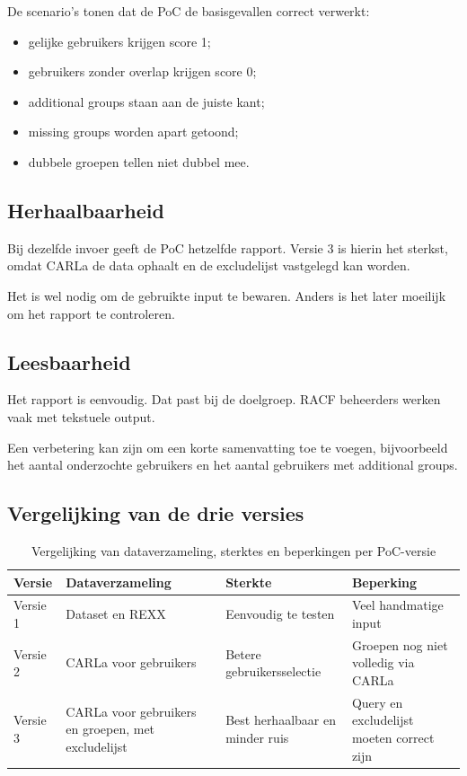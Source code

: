 De scenario's tonen dat de PoC de basisgevallen correct verwerkt:

\begin{itemize}
	\item gelijke gebruikers krijgen score 1;
	\item gebruikers zonder overlap krijgen score 0;
	\item additional groups staan aan de juiste kant;
	\item missing groups worden apart getoond;
	\item dubbele groepen tellen niet dubbel mee.
\end{itemize}

\subsection*{Herhaalbaarheid}

Bij dezelfde invoer geeft de PoC hetzelfde rapport. Versie 3 is hierin het sterkst, omdat CARLa de data ophaalt en de excludelijst vastgelegd kan worden.

Het is wel nodig om de gebruikte input te bewaren. Anders is het later moeilijk om het rapport te controleren.

\subsection*{Leesbaarheid}

Het rapport is eenvoudig. Dat past bij de doelgroep. RACF beheerders werken vaak met tekstuele output.

Een verbetering kan zijn om een korte samenvatting toe te voegen, bijvoorbeeld het aantal onderzochte gebruikers en het aantal gebruikers met additional groups.

\subsection*{Vergelijking van de drie versies}

\begin{table}[htbp]
\centering
\caption[Vergelijking van de drie PoC-versies]{Vergelijking van dataverzameling, sterktes en beperkingen per PoC-versie}
\label{tab:vergelijking-poc-versies}
\begin{tabular}{|p{2.5cm}|p{3.5cm}|p{3.5cm}|p{3cm}|}
\hline
\textbf{Versie} & \textbf{Dataverzameling} & \textbf{Sterkte} & \textbf{Beperking} \\
\hline
Versie 1 & Dataset en REXX & Eenvoudig te testen & Veel handmatige input \\
\hline
Versie 2 & CARLa voor gebruikers & Betere gebruikersselectie & Groepen nog niet volledig via CARLa \\
\hline
Versie 3 & CARLa voor gebruikers en groepen, met excludelijst & Best herhaalbaar en minder ruis & Query en excludelijst moeten correct zijn \\
\hline
\end{tabular}
\end{table}

